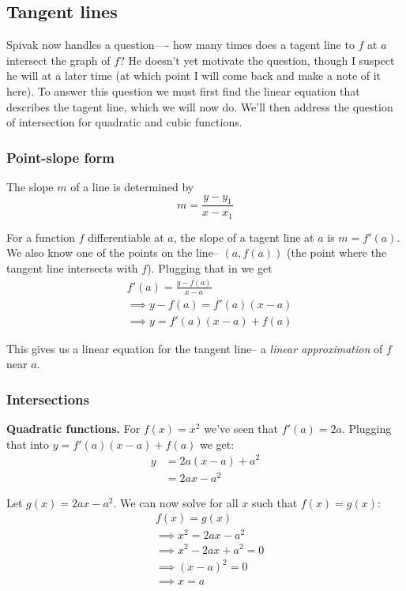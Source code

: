 \subsection{Tangent lines}
Spivak now handles a question---- how many times does a tagent line to
$f$ at $a$ intersect the graph of $f$? He doesn't yet motivate the
question, though I suspect he will at a later time (at which point I
will come back and make a note of it here). To answer this question we
must first find the linear equation that describes the tagent line,
which we will now do. We'll then address the question of intersection
for quadratic and cubic functions.

\subsubsection*{Point-slope form}\label{subsubsec-point-slope-form}
The slope $m$ of a line is determined by
\[m=\frac{y-y_1}{x-x_1}\]

For a function $f$ differentiable at $a$, the slope of a tagent line
at $a$ is $m=f'(a)$. We also know one of the points on the line--
$(a, f(a))$ (the point where the tangent line intersects with $f$).
Plugging that in we get
\begin{align*}
  &f'(a)=\frac{y-f(a)}{x-a}\\
  &\implies y-f(a)=f'(a)(x-a)\\
  &\implies y=f'(a)(x-a)+f(a)
\end{align*}

This gives us a linear equation for the tangent line-- a \textit{linear
  approximation} of $f$ near $a$.

\subsubsection*{Intersections}

\textbf{Quadratic functions.} For $f(x)=x^2$ we've seen that
$f'(a)=2a$. Plugging that into $y=f'(a)(x-a)+f(a)$ we get:
\begin{align*}
  y&=2a(x-a)+a^2\\
   &=2ax-a^2
\end{align*}

Let $g(x)=2ax-a^2$. We can now solve for all $x$ such that
$f(x)=g(x)$:
\begin{align*}
  &f(x)=g(x)\\
  &\implies x^2=2ax-a^2\\
  &\implies x^2-2ax+a^2=0\\
  &\implies (x-a)^2=0\\
  &\implies x=a
\end{align*}

